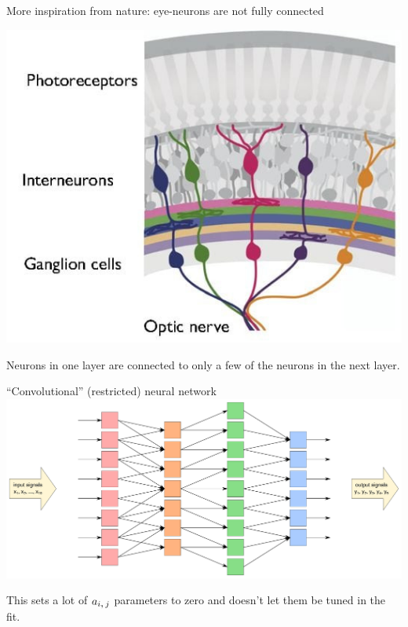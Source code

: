 \documentclass[aspectratio=169]{beamer}
\begin{document}
\begin{frame}{More inspiration from nature: eye-neurons are not fully connected}
\vspace{0.35 cm}
\begin{center}
\includegraphics[width=0.5\linewidth]{eye-neurons.jpg}
\end{center}

\vspace{0.25 cm}
Neurons in one layer are connected to only a few of the neurons in the next layer.
\end{frame}

\begin{frame}{``Convolutional'' (restricted) neural network}
\vspace{0.25 cm}
\includegraphics[width=\linewidth]{convolutional-neural-network-layers.pdf}

\vspace{0.25 cm}
This sets a lot of $a_{i\mbox{,\,}j}$ parameters to zero and doesn't let them be tuned in the fit.
\end{frame}
\end{document}
